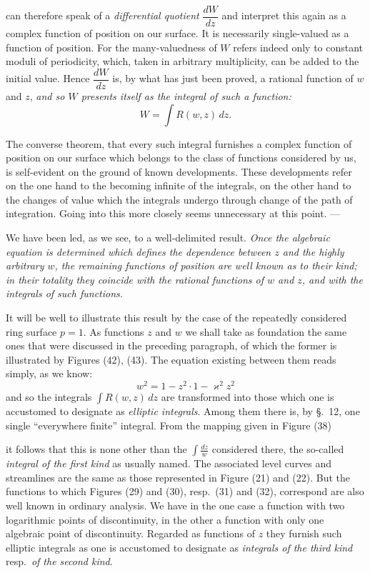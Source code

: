 \documentclass{article}
\begin{document}
can therefore speak of a \emph{differential quotient} $\dfrac{dW}{dz}$ and interpret this again as a complex function of position on our surface. It is necessarily single-valued as a function of position. For the many-valuedness of $W$ refers indeed only to constant moduli of periodicity, which, taken in arbitrary multiplicity, can be added to the initial value. Hence $\dfrac{dW}{dz}$ is, by what has just been proved, a rational function of $w$ and $z$, \emph{and so $W$ presents itself as the integral of such a function:}
\[ W = \int R(w, z)\,dz. \]

The converse theorem, that every such integral furnishes a complex function of position on our surface which belongs to the class of functions considered by us, is self-evident on the ground of known developments. These developments refer on the one hand to the becoming infinite of the integrals, on the other hand to the changes of value which the integrals undergo through change of the path of integration. Going into this more closely seems unnecessary at this point. ---

We have been led, as we see, to a well-delimited result. \emph{Once the algebraic equation is determined which defines the dependence between $z$ and the highly arbitrary $w$, the remaining functions of position are well known as to their kind; in their totality they coincide with the rational functions of $w$ and $z$, and with the integrals of such functions.}

It will be well to illustrate this result by the case of the repeatedly considered ring surface $p = 1$. As functions $z$ and $w$ we shall take as foundation the same ones that were discussed in the preceding paragraph, of which the former is illustrated by Figures (42), (43). The equation existing between them reads simply, as we know:
\[ w^{2} = 1 - z^{2} \cdot 1 - \varkappa^{2} z^{2} \]
and so the integrals $\displaystyle\int R(w, z)\,dz$ are transformed into those which one is accustomed to designate as \emph{elliptic integrals}. Among them there is, by §.~12, one single “everywhere finite” integral. From the mapping given in Figure (38)

it follows that this is none other than the $\displaystyle\int \frac{dz}{w}$ considered there, the so-called \emph{integral of the first kind} as usually named. The associated level curves and streamlines are the same as those represented in Figure (21) and (22). But the functions to which Figures (29) and (30), resp.\ (31) and (32), correspond are also well known in ordinary analysis. We have in the one case a function with two logarithmic points of discontinuity, in the other a function with only one algebraic point of discontinuity. Regarded as functions of $z$ they furnish such elliptic integrals as one is accustomed to designate as \emph{integrals of the third kind} resp.\ \emph{of the second kind}.
\end{document}
